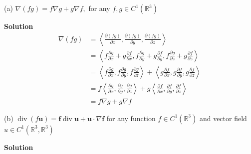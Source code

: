 \documentclass{article}
\begin{document}
(a) $\nabla(f g) = f \nabla g + g \nabla f,$ for any
$f, g \in C^{1}\left(\mathbb{R}^{3}\right)$

\textbf{Solution}
%
\begin{align*}
    \nabla (f g)
        &= \left\langle
                \frac{\partial (f g)}{\partial x},
                \frac{\partial (f g)}{\partial y},
                \frac{\partial (f g)}{\partial z}
           \right\rangle \\
        &= \left\langle
                f \frac{\partial g}{\partial x} + g \frac{\partial f}{\partial x},
                f \frac{\partial g}{\partial y} + g \frac{\partial f}{\partial y},
                f \frac{\partial g}{\partial z} + g \frac{\partial f}{\partial z}
           \right\rangle \\
        &= \left\langle
                f \frac{\partial g}{\partial x},
                f \frac{\partial g}{\partial y},
                f \frac{\partial g}{\partial z}
           \right\rangle
           +
           \left\langle
                g \frac{\partial f}{\partial x},
                g \frac{\partial f}{\partial y},
                g \frac{\partial f}{\partial z}
           \right\rangle \\
        &= f \left\langle
                \frac{\partial g}{\partial x},
                \frac{\partial g}{\partial y},
                \frac{\partial g}{\partial z}
           \right\rangle
           +
           g \left\langle
                \frac{\partial f}{\partial x},
                \frac{\partial f}{\partial y},
                \frac{\partial f}{\partial z}
           \right\rangle \\
        &= f \nabla g + g \nabla f
\end{align*}

\vspace{5mm}
(b) $\operatorname{div}(f \mathbf{u}) = \mathbf{f} \operatorname{div} \mathbf{u} + \mathbf{u} \cdot \nabla \mathbf{f}$
for any function $f \in C^{1}\left(\mathbb{R}^{3}\right)$ and vector field
$u \in C^{1}\left(\mathbb{R}^{3}, \mathbb{R}^{3}\right)$

\textbf{Solution}
\end{document}
